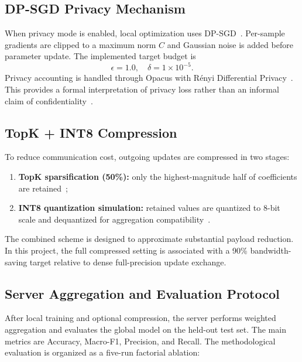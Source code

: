 \subsection{DP-SGD Privacy Mechanism}
When privacy mode is enabled, local optimization uses
DP-SGD~\cite{abadi2016deep}. Per-sample gradients are clipped to a maximum
norm $C$ and Gaussian noise is added before parameter update. The
implemented target budget is
\begin{equation}
\epsilon = 1.0, \quad \delta = 1 \times 10^{-5}.
\end{equation}
Privacy accounting is handled through Opacus with R\'enyi Differential
Privacy~\cite{mironov2017renyi}. This provides a formal interpretation of
privacy loss rather than an informal claim of
confidentiality~\cite{ziller2021differentially,hou2023improving}.

\subsection{TopK + INT8 Compression}
To reduce communication cost, outgoing updates are compressed in two stages:
\begin{enumerate}[leftmargin=*]
  \item \textbf{TopK sparsification (50\%):} only the highest-magnitude half
        of coefficients are retained~\cite{habib2025cflsparsemed};
  \item \textbf{INT8 quantization simulation:} retained values are quantized
        to 8-bit scale and dequantized for aggregation
        compatibility~\cite{asad2024fesec,sun2025medfd}.
\end{enumerate}
The combined scheme is designed to approximate substantial payload
reduction. In this project, the full compressed setting is associated with a
90\% bandwidth-saving target relative to dense full-precision update
exchange.

\subsection{Server Aggregation and Evaluation Protocol}
After local training and optional compression, the server performs weighted
aggregation and evaluates the global model on the held-out test set. The
main metrics are Accuracy, Macro-F1, Precision, and Recall. The
methodological evaluation is organized as a five-run factorial ablation:

